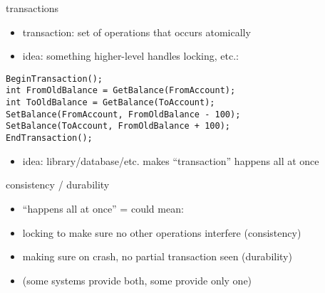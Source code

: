 \begin{frame}[fragile]{transactions}
    \begin{itemize}
    \item transaction: set of operations that occurs atomically
    \item idea: something higher-level handles locking, etc.:
   \end{itemize}
\begin{Verbatim}
BeginTransaction();
int FromOldBalance = GetBalance(FromAccount);
int ToOldBalance = GetBalance(ToAccount);
SetBalance(FromAccount, FromOldBalance - 100);
SetBalance(ToAccount, FromOldBalance + 100);
EndTransaction();
\end{Verbatim}
    \begin{itemize}
    \item idea: library/database/etc. makes ``transaction'' happens all at once
    \end{itemize}
\end{frame}

\begin{frame}{consistency / durability}
    \begin{itemize}
    \item ``happens all at once'' = could mean:
    \vspace{.5cm}
    \item locking to make sure no other operations interfere (consistency)
    \item making sure on crash, no partial transaction seen (durability)
    \vspace{.5cm}
    \item \small (some systems provide both, some provide only one)
    \end{itemize}
\end{frame}
